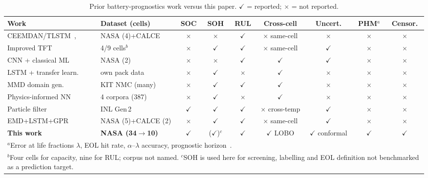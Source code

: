\documentclass[conference,a4paper]{IEEEtran}
\begin{document}
\begin{table}[!t]
\caption{Prior battery-prognostics work versus this paper. $\checkmark$ = reported; $\times$ = not reported.}\vspace{-2pt}
\label{tab:related}
\centering
\scriptsize
\setlength{\tabcolsep}{4pt}
\begin{tabular}{llccccccc}
\toprule
Work & Dataset (cells) & SOC & SOH & RUL & Cross-cell & Uncert. &
PHM$^{a}$ & Censor. \\
\midrule
CEEMDAN/TLSTM~\cite{ceemdan2025},\cite{tlstm2025} & NASA (4)+CALCE & $\times$ & $\times$ & $\checkmark$ & $\times$ same-cell & $\times$ & $\times$ & $\times$ \\
Improved TFT~\cite{tftenergy2024}       & 4/9 cells$^{b}$   & $\times$ & $\checkmark$ & $\checkmark$ & $\times$ same-cell & $\checkmark$ & $\times$ & $\times$ \\
CNN + classical ML~\cite{cnnframework2026} & NASA (2)       & $\times$ & $\times$ & $\checkmark$ & $\checkmark$ & $\checkmark$ & $\times$ & $\times$ \\
LSTM + transfer learn.~\cite{shu2021}  & own pack data     & $\times$ & $\checkmark$ & $\times$ & $\checkmark$ & $\times$ & $\times$ & $\times$ \\
MMD domain gen.~\cite{mmd2025}          & KIT NMC (many)    & $\times$ & $\checkmark$ & $\checkmark$ & $\checkmark$ & $\times$ & $\times$ & $\times$ \\
Physics-informed NN~\cite{pinn2024}     & 4 corpora (387)   & $\times$ & $\checkmark$ & $\times$ & $\checkmark$ & $\times$ & $\times$ & $\times$ \\
Particle filter~\cite{saha2009}         & INL Gen\,2        & $\checkmark$ & $\checkmark$ & $\checkmark$ & $\times$ cross-temp & $\checkmark$ & $\times$ & $\times$ \\
EMD+LSTM+GPR~\cite{liu2021uq}          & NASA (5)+CALCE (2) & $\times$ & $\checkmark$ & $\checkmark$ & $\times$ same-cell & $\checkmark$ & $\times$ & $\times$ \\
\midrule
\textbf{This work} & \textbf{NASA (34$\rightarrow$10)} &
$\checkmark$ & ($\checkmark$)$^{c}$ & $\checkmark$ & $\checkmark$ LOBO &
$\checkmark$ conformal & $\checkmark$ & $\checkmark$ \\
\bottomrule
\multicolumn{9}{l}{$^{a}$Error at life fractions $\lambda$, EOL hit rate,
$\alpha$--$\lambda$ accuracy, prognostic horizon~\cite{saxena2008}.} \\
\multicolumn{9}{l}{$^{b}$Four cells for capacity, nine for RUL; corpus not
named. $^{c}$SOH is used here for screening, labelling and EOL definition
not benchmarked as a prediction target.}
\end{tabular}
\end{table}
\end{document}
